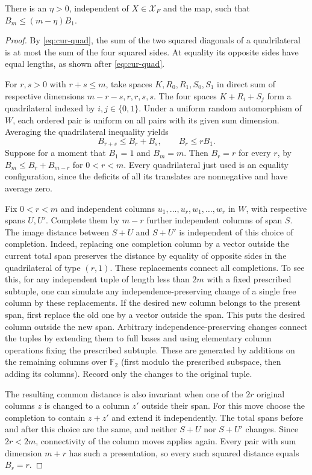 \begin{lemma}\label{lem:wire-grassmann-gap}\label{lem:grassmann-gap}
There is an $\eta>0$, independent of $X\in\mathcal X_F$ and the map, such
that $B_m\le(m-\eta)B_1$.
\end{lemma}

\begin{proof}
By \eqref{eq:cur-quad}, the sum of the two squared diagonals of a
quadrilateral is at most the sum of the four squared sides. At
equality its opposite sides have equal lengths, as shown after
\eqref{eq:cur-quad}.

For $r,s>0$ with $r+s\le m$, take spaces $K,R_0,R_1,S_0,S_1$ in direct
sum of respective dimensions $m-r-s,r,r,s,s$. The four spaces
$K+R_i+S_j$ form a quadrilateral indexed by $i,j\in\{0,1\}$. Under a
uniform random automorphism of $W$, each ordered pair is uniform on all
pairs with its given sum dimension. Averaging the quadrilateral inequality
yields
\[
 B_{r+s}\le B_r+B_s,\qquad B_r\le rB_1.
\]
Suppose for a moment that $B_1=1$ and $B_m=m$. Then $B_r=r$ for every
$r$, by $B_m\le B_r+B_{m-r}$ for $0<r<m$. Every quadrilateral just used
is an equality configuration, since the deficits of all its translates are nonnegative
and have average zero.

Fix $0<r<m$ and independent columns $u_1,\ldots,u_r,w_1,\ldots,w_r$ in
$W$, with respective spans $U,U'$. Complete them by $m-r$ further
independent columns of span $S$. The image distance between $S+U$ and
$S+U'$ is independent of this choice of completion. Indeed, replacing one
completion column by a vector outside the current total span preserves the
distance by equality of opposite sides in the quadrilateral of type
$(r,1)$. These replacements connect all completions. To see this, for any
independent tuple of length less than $2m$ with a fixed prescribed
subtuple, one can simulate any independence-preserving change of a single
free column by these replacements. If the desired new column belongs to
the present span, first replace the old one by a vector outside the span.
This puts the desired column outside the new span. Arbitrary
independence-preserving changes connect the tuples by extending them to full
bases and using elementary column operations fixing the prescribed subtuple.
These are generated by additions on the remaining columns over
$\mathbb F_2$ (first modulo the prescribed subspace, then adding its
columns). Record only the changes to the original tuple.

The resulting common distance is also invariant when one of the $2r$
original columns $z$ is changed to a column $z'$ outside their span.
For this move choose the completion to contain $z+z'$ and extend it independently. The
total spans before and after this choice are the same, and neither
$S+U$ nor $S+U'$ changes. Since $2r<2m$, connectivity of the column
moves applies again. Every pair with sum dimension $m+r$ has such a
presentation, so every such squared distance equals $B_r=r$.


\end{proof}
